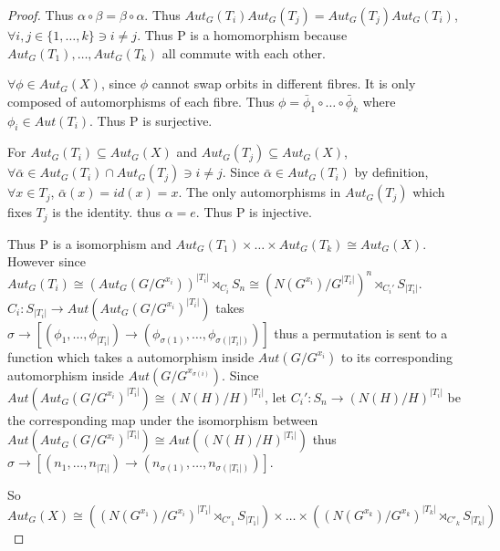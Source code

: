 \documentclass{article}
\begin{document}
\begin{proof}
    Thus $\alpha \circ \beta = \beta \circ \alpha$. Thus $Aut_G(T_i) Aut_G(T_j) = Aut_G(T_j) Aut_G(T_i)$, $\forall i, j \in \{1, \ldots, k\} \ni i \neq j$. Thus P is a homomorphism because $Aut_G(T_1), \ldots, Aut_G(T_k)$ all commute with each other. 

    $\forall \phi \in Aut_G(X)$, since $\phi$ cannot swap orbits in different fibres. It is only composed of automorphisms of each fibre. Thus $\phi = \bar \phi_1 \circ \ldots \circ \bar \phi_k$ where $\phi_i \in Aut(T_i)$. Thus P is surjective. 


    For $Aut_G(T_i) \subseteq Aut_G(X)$ and $Aut_G(T_j) \subseteq Aut_G(X)$, $\forall \bar \alpha \in Aut_G(T_i) \cap Aut_G(T_j) \ni i \neq j$. Since $\bar \alpha \in Aut_G(T_i)$ by definition, $\forall x \in T_j$, $\bar \alpha(x) = id(x) = x$. The only automorphisms in $Aut_G(T_j)$ which fixes $T_j$ is the identity. thus $\alpha = e$. Thus P is injective.
    

    Thus P is a isomorphism and $Aut_G(T_1) \times \ldots \times Aut_G(T_k) \cong Aut_G(X)$. However since $Aut_G(T_i) \cong (Aut_G(G/G^{x_i}))^{|T_i|} \rtimes_{C_i} S_n \cong (N(G^{x_i})/G^{|T_i|})^n \rtimes_{C_i'} S_{|T_i|}$. $C_i: S_{|T_i|} \to Aut(Aut_G(G/G^{x_i})^{|T_i|})$ takes $\sigma \to [(\phi_1, \ldots, \phi_{|T_i|}) \to (\phi_{\sigma(1)}, \ldots, \phi_{\sigma(|T_i|)})]$ thus a permutation is sent to a function which takes a automorphism inside $Aut(G/G^{x_i})$ to its corresponding automorphism inside $Aut(G/G^{x_{\sigma(i)}})$. Since $Aut(Aut_G(G/G^{x_i})^{|T_i|}) \cong (N(H)/H)^{|T_i|}$, let $C_i' : S_n \to (N(H)/H)^{|T_i|}$ be the corresponding map under the isomorphism between $Aut(Aut_G(G/G^{x_i})^{|T_i|}) \cong Aut((N(H)/H)^{|T_i|})$ thus $\sigma \to [(n_1, \ldots, n_{|T_i|}) \to (n_{\sigma(1)}, \ldots, n_{\sigma(|T_i|)})]$.
    
    So $Aut_G(X) \cong ((N(G^{x_1})/G^{x_i})^{|T_1|} \rtimes_{C'_1} S_{|T_1|}) \times \ldots \times ((N(G^{x_k})/G^{x_k})^{|T_k|} \rtimes_{C'_k} S_{|T_k|})$
\end{proof}
\end{document}
